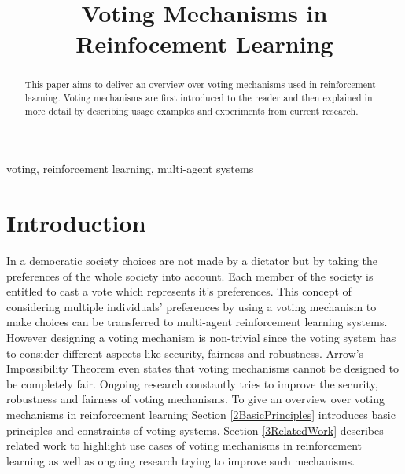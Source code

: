 \documentclass[conference]{IEEEtran}
\begin{document}
\title{Voting Mechanisms in Reinfocement Learning}

\author{
}

\maketitle


\begin{abstract}
This paper aims to deliver an overview over voting mechanisms used in reinforcement learning.
Voting mechanisms are first introduced to the reader and then explained in more detail by
describing usage examples and experiments from current research. 
\end{abstract}

\begin{IEEEkeywords}
voting, reinforcement learning, multi-agent systems
\end{IEEEkeywords}

\section{Introduction}
In a democratic society choices are not made by a dictator but by taking the preferences of the whole society into account. Each member of the society is entitled to cast a vote which represents it's preferences.
This concept of considering multiple individuals' preferences by using a voting mechanism to make choices can be transferred to multi-agent reinforcement learning systems.
\newline
However designing a voting mechanism is non-trivial since the voting system has to consider different aspects like security, fairness and robustness.
Arrow's Impossibility Theorem even states that voting mechanisms cannot be designed to be completely fair.
Ongoing research constantly tries to improve the security, robustness and fairness of voting mechanisms.
\newline
To give an overview over voting mechanisms in reinforcement learning Section \ref{2BasicPrinciples} introduces basic principles and constraints of voting systems.
Section \ref{3RelatedWork} describes related work to highlight use cases of voting mechanisms in reinforcement learning as well as ongoing research trying to improve such mechanisms.
\end{document}
